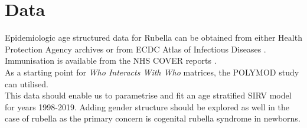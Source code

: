 \documentclass{article}
\theoremstyle{definition}
\begin{document}
\section{Data}
Epidemiologic age structured data for Rubella can be obtained from either Health Protection Agency archives \cite{agency_epidemiological_nodate} or from ECDC Atlas of Infectious Diseases \cite{noauthor_surveillance_nodate}.\\
Immunisation is available from the NHS COVER reports \cite{noauthor_childhood_nodate}.\\
As a starting point for \emph{Who Interacts With Who} matrices, the POLYMOD study \cite{mossong_social_2008} can utilised.\\
This data should enable us to parametrise and fit an age stratified SIRV model for years 1998-2019. Adding gender structure should be explored as well in the case of rubella as the primary concern is cogenital rubella syndrome in newborns. 
\end{document}
